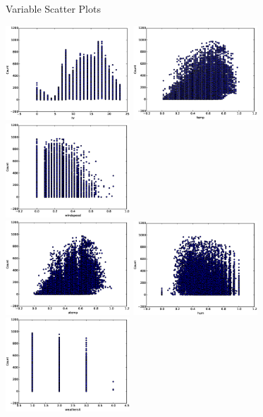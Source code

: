\documentclass[pdf]{beamer}
\begin{document}
\begin{frame}{Variable Scatter Plots}
\begin{center}
\includegraphics[width=0.35\textwidth]{plots/hr_v_Count_corrcheck.eps}
\includegraphics[width=0.35\textwidth]{plots/temp_v_Count_corrcheck.eps}
\includegraphics[width=0.35\textwidth]{plots/windspeed_v_Count_corrcheck.eps}\\
\includegraphics[width=0.35\textwidth]{plots/atemp_v_Count_corrcheck.eps}
\includegraphics[width=0.35\textwidth]{plots/hum_v_Count_corrcheck.eps}
\includegraphics[width=0.35\textwidth]{plots/weathersit_v_Count_corrcheck.eps}\\
\end{center}
\end{frame}
\end{document}
